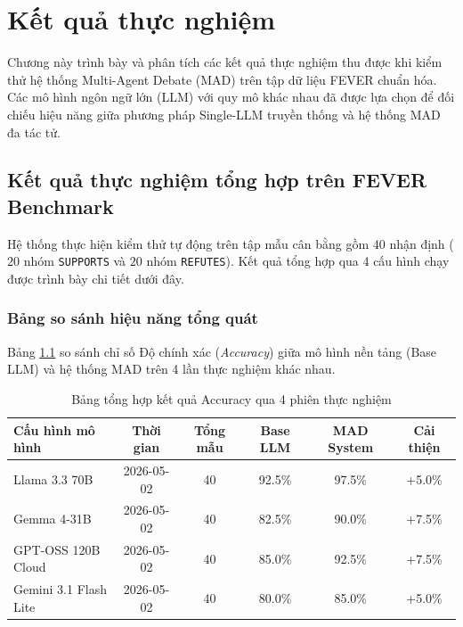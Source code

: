 \documentclass[12pt,a4paper]{report}
\begin{document}
\chapter{Kết quả thực nghiệm}
\label{ch:ket_qua_thuc_nghiem}

Chương này trình bày và phân tích các kết quả thực nghiệm thu được khi kiểm thử hệ thống Multi-Agent Debate (MAD) trên tập dữ liệu FEVER chuẩn hóa. Các mô hình ngôn ngữ lớn (LLM) với quy mô khác nhau đã được lựa chọn để đối chiếu hiệu năng giữa phương pháp Single-LLM truyền thống và hệ thống MAD đa tác tử.

\section{Kết quả thực nghiệm tổng hợp trên FEVER Benchmark}
Hệ thống thực hiện kiểm thử tự động trên tập mẫu cân bằng gồm $40$ nhận định ($20$ nhóm \texttt{SUPPORTS} và $20$ nhóm \texttt{REFUTES}). Kết quả tổng hợp qua 4 cấu hình chạy được trình bày chi tiết dưới đây.

\subsection{Bảng so sánh hiệu năng tổng quát}
Bảng \ref{tab:fever_overall_results} so sánh chỉ số Độ chính xác (\textit{Accuracy}) giữa mô hình nền tảng (Base LLM) và hệ thống MAD trên 4 lần thực nghiệm khác nhau.

\begin{table}[htbp]
    \centering
    \caption{Bảng tổng hợp kết quả Accuracy qua 4 phiên thực nghiệm}
    \label{tab:fever_overall_results}
    \begin{tabular}{|l|c|c|c|c|c|}
        \hline
        \textbf{Cấu hình mô hình} & \textbf{Thời gian} & \textbf{Tổng mẫu} & \textbf{Base LLM} & \textbf{MAD System} & \textbf{Cải thiện} \\
        \hline
        Llama 3.3 70B & 2026-05-02 & 40 & 92.5\% & 97.5\% & +5.0\% \\
        Gemma 4-31B & 2026-05-02 & 40 & 82.5\% & 90.0\% & +7.5\% \\
        GPT-OSS 120B Cloud & 2026-05-02 & 40 & 85.0\% & 92.5\% & +7.5\% \\
        Gemini 3.1 Flash Lite & 2026-05-02 & 40 & 80.0\% & 85.0\% & +5.0\% \\
        \hline
    \end{tabular}
\end{table}
\end{document}
